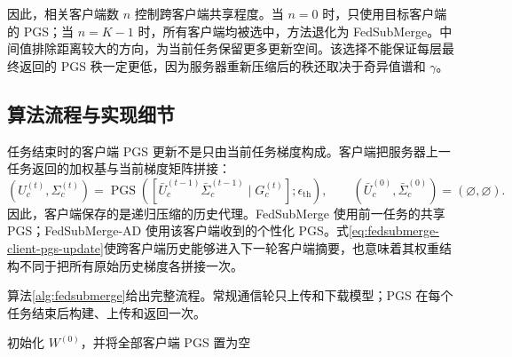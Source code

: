 因此，相关客户端数 $n$ 控制跨客户端共享程度。当 $n=0$ 时，只使用目标客户端的 PGS；当 $n=K-1$ 时，所有客户端均被选中，方法退化为 FedSubMerge。中间值排除距离较大的方向，为当前任务保留更多更新空间。该选择不能保证每层最终返回的 PGS 秩一定更低，因为服务器重新压缩后的秩还取决于奇异值谱和 $\gamma$。

\subsection{算法流程与实现细节}
\label{subsec:fedsubmerge-algorithm}

任务结束时的客户端 PGS 更新不是只由当前任务梯度构成。客户端把服务器上一任务返回的加权基与当前梯度矩阵拼接：
\begin{equation}
(U_c^{(t)},\Sigma_c^{(t)})
=
\operatorname{PGS}\!\left(
\left[
\bar U_c^{(t-1)}\bar\Sigma_c^{(t-1)}
\mid
G_c^{(t)}
\right];
\epsilon_{\mathrm{th}}
\right),
\qquad
(\bar U_c^{(0)},\bar\Sigma_c^{(0)})=(\varnothing,\varnothing).
\label{eq:fedsubmerge-client-pgs-update}
\end{equation}
因此，客户端保存的是递归压缩的历史代理。FedSubMerge 使用前一任务的共享 PGS；FedSubMerge-AD 使用该客户端收到的个性化 PGS。式\eqref{eq:fedsubmerge-client-pgs-update}使跨客户端历史能够进入下一轮客户端摘要，也意味着其权重结构不同于把所有原始历史梯度各拼接一次。

算法\ref{alg:fedsubmerge}给出完整流程。常规通信轮只上传和下载模型；PGS 在每个任务结束后构建、上传和返回一次。

\begin{algorithm}[htbp]
\DontPrintSemicolon
{}
初始化 $W^{(0)}$，并将全部客户端 PGS 置为空\;
\caption{FedSubMerge 与 FedSubMerge-AD}
\label{alg:fedsubmerge}
\end{algorithm}


